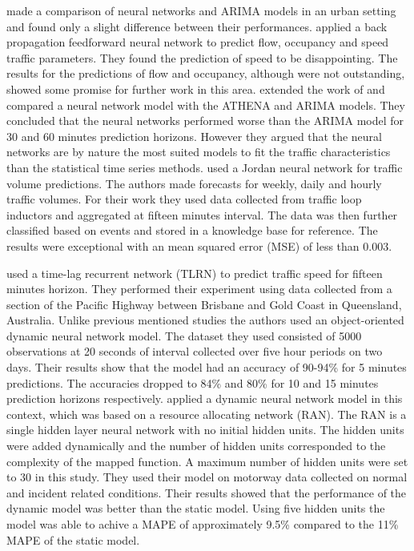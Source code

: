 \citet{clark1993use} made a comparison of neural networks and ARIMA models in an urban setting
and found only a slight difference between their performances. \citet{dougherty1997short} applied a
back propagation feedforward neural network to predict flow, occupancy and speed traffic parameters.
They found the prediction of speed to be disappointing. The results for the predictions of flow and occupancy,
although were not outstanding, showed some promise for further work in this area.
\citet{kirby1997should} extended the work of \citet{clark1993use} and compared a neural network model
with the ATHENA and ARIMA models. They concluded that the neural networks performed worse than the
ARIMA model for 30 and 60 minutes prediction horizons. However they argued that the neural networks
are by nature the most suited models to fit the traffic characteristics than the statistical time
series methods. \citet{yasdi1999prediction} used a Jordan neural network for traffic volume predictions.
The authors made forecasts for weekly, daily and hourly traffic volumes. For their work they used
data collected from traffic loop inductors and aggregated at fifteen minutes interval. The data was
then further classified based on events and stored in a knowledge base for reference. The results were
exceptional with an mean squared error (MSE) of less than 0.003.

\citet{dia2001object} used a time-lag recurrent network (TLRN) to predict traffic speed for fifteen
minutes horizon. They performed their experiment using data collected from a section of the Pacific Highway between
Brisbane and Gold Coast in Queensland, Australia. Unlike previous mentioned studies the authors used
an object-oriented dynamic neural network model. The dataset they used consisted of 5000
observations at 20 seconds of interval collected over five hour periods on two days. Their results
show that the model had an accuracy of 90-94\% for 5 minutes predictions. The accuracies dropped
to 84\% and 80\% for 10 and 15 minutes prediction horizons respectively. \citet{chen2001use} applied
a dynamic neural network model in this context, which was based on a resource allocating network (RAN).
The RAN is a single hidden layer neural network with no initial hidden units. The hidden units were added
dynamically and the number of hidden units corresponded to the complexity of the mapped function.
A maximum number of hidden units were set to 30 in this study. They used their model on motorway
data collected on normal and incident related conditions. Their results showed that the performance of
 the dynamic model was better than the static model. Using five hidden units the model was able to
 achive a MAPE of approximately 9.5\% compared to the 11\% MAPE of the static model.

